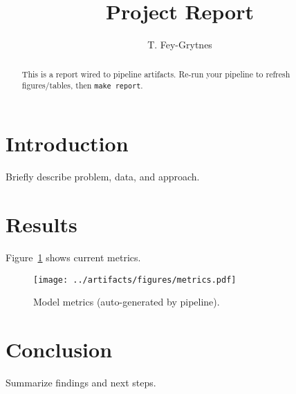 \documentclass[sigconf]{acmart}
\title{Project Report}
\author{T. Fey-Grytnes}
\affiliation{%
  \institution{University of Colorado Boulder}
  \city{Boulder}
  \state{CO}
  \country{USA1}
}
\begin{document}
\begin{abstract}
This is a report wired to pipeline artifacts. Re-run your pipeline to refresh figures/tables, then \texttt{make report}.
\end{abstract}
\maketitle

\section{Introduction}
Briefly describe problem, data, and approach.

\section{Results}
Figure~\ref{fig:metrics} shows current metrics.

\begin{figure}[h]
  \centering
  \texttt{[image: ../artifacts/figures/metrics.pdf]}
  \caption{Model metrics (auto-generated by pipeline).}
  \label{fig:metrics}
\end{figure}


\section{Conclusion}
Summarize findings and next steps.
\end{document}

